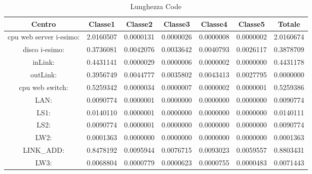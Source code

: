 \begin{table}[H]
\begin{center}\begin{scriptsize}
\begin{tabular}{||c|c|c|c|c|c|c||}
\hline
Centro &Classe1 &Classe2 &Classe3 &Classe4 &Classe5 &Totale\\
\hline
\hline
 cpu web server i-esimo: 	&2.0160507	&0.0000131	&0.0000026	&0.0000008	&0.0000002	&2.0160674	\\\hline
 disco i-esimo: 	&0.3736081	&0.0042076	&0.0033642	&0.0040793	&0.0026117	&0.3878709	\\\hline
 inLink: 	&0.4431141	&0.0000029	&0.0000006	&0.0000002	&0.0000000	&0.4431178	\\\hline
 outLink: 	&0.3956749	&0.0044777	&0.0035802	&0.0043413	&0.0027795	&0.0000000	\\\hline
 cpu web switch: 	&0.5259342	&0.0000034	&0.0000007	&0.0000002	&0.0000001	&0.5259386	\\\hline
 LAN: 	&0.0090774	&0.0000001	&0.0000000	&0.0000000	&0.0000000	&0.0090774	\\\hline
 LS1: 	&0.0140110	&0.0000001	&0.0000000	&0.0000000	&0.0000000	&0.0140111	\\\hline
 LS2: 	&0.0090774	&0.0000001	&0.0000000	&0.0000000	&0.0000000	&0.0090774	\\\hline
 LW2: 	&0.0001363	&0.0000000	&0.0000000	&0.0000000	&0.0000000	&0.0001363	\\\hline
 LINK\_ADD: 	&0.8478192	&0.0095944	&0.0076715	&0.0093023	&0.0059557	&0.8803431	\\\hline
 LW3: 	&0.0068804	&0.0000779	&0.0000623	&0.0000755	&0.0000483	&0.0071443	\\\hline
\end{tabular}
\end{scriptsize}\end{center}
\caption{Lunghezza Code}
\label{lunghezzacode}
\end{table}

